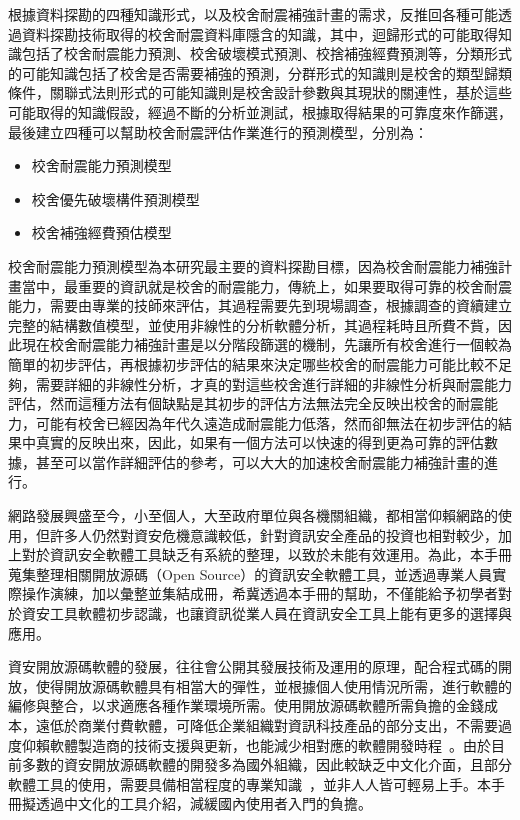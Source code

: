 根據資料探勘的四種知識形式，以及校舍耐震補強計畫的需求，反推回各種可能透過資料探勘技術取得的校舍耐震資料庫隱含的知識，其中，迴歸形式的可能取得知識包括了校舍耐震能力預測、校舍破壞模式預測、校捨補強經費預測等，分類形式的可能知識包括了校舍是否需要補強的預測，分群形式的知識則是校舍的類型歸類條件，關聯式法則形式的可能知識則是校舍設計參數與其現狀的關連性，基於這些可能取得的知識假設，經過不斷的分析並測試，根據取得結果的可靠度來作篩選，最後建立四種可以幫助校舍耐震評估作業進行的預測模型，分別為：

\begin{itemize}
\item 校舍耐震能力預測模型
\item 校舍優先破壞構件預測模型
\item 校舍補強經費預估模型
\end{itemize}

校舍耐震能力預測模型為本研究最主要的資料探勘目標，因為校舍耐震能力補強計畫當中，最重要的資訊就是校舍的耐震能力，傳統上，如果要取得可靠的校舍耐震能力，需要由專業的技師來評估，其過程需要先到現場調查，根據調查的資續建立完整的結構數值模型，並使用非線性的分析軟體分析，其過程耗時且所費不貲，因此現在校舍耐震能力補強計畫是以分階段篩選的機制，先讓所有校舍進行一個較為簡單的初步評估，再根據初步評估的結果來決定哪些校舍的耐震能力可能比較不足夠，需要詳細的非線性分析，才真的對這些校舍進行詳細的非線性分析與耐震能力評估，然而這種方法有個缺點是其初步的評估方法無法完全反映出校舍的耐震能力，可能有校舍已經因為年代久遠造成耐震能力低落，然而卻無法在初步評估的結果中真實的反映出來，因此，如果有一個方法可以快速的得到更為可靠的評估數據，甚至可以當作詳細評估的參考，可以大大的加速校舍耐震能力補強計畫的進行。


網路發展興盛至今，小至個人，大至政府單位與各機關組織，都相當仰賴網路的使用，但許多人仍然對資安危機意識較低，針對資訊安全產品的投資也相對較少，加上對於資訊安全軟體工具缺乏有系統的整理，以致於未能有效運用。為此，本手冊蒐集整理相關開放源碼（Open Source）的資訊安全軟體工具，並透過專業人員實際操作演練，加以彙整並集結成冊，希冀透過本手冊的幫助，不僅能給予初學者對於資安工具軟體初步認識，也讓資訊從業人員在資訊安全工具上能有更多的選擇與應用。

資安開放源碼軟體的發展，往往會公開其發展技術及運用的原理，配合程式碼的開放，使得開放源碼軟體具有相當大的彈性，並根據個人使用情況所需，進行軟體的編修與整合，以求適應各種作業環境所需。使用開放源碼軟體所需負擔的金錢成本，遠低於商業付費軟體，可降低企業組織對資訊科技產品的部分支出，不需要過度仰賴軟體製造商的技術支援與更新，也能減少相對應的軟體開發時程~\cite{GarofalakisHM07}。由於目前多數的資安開放源碼軟體的開發多為國外組織，因此較缺乏中文化介面，且部分軟體工具的使用，需要具備相當程度的專業知識~\cite{MaddenFHH02}，並非人人皆可輕易上手。本手冊擬透過中文化的工具介紹，減緩國內使用者入門的負擔。

